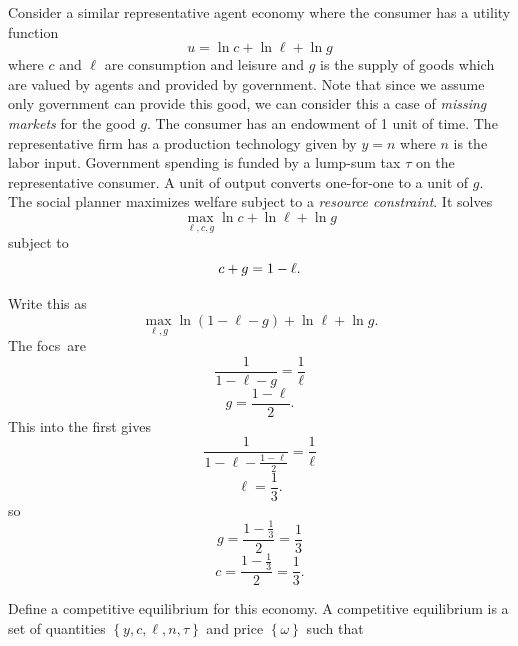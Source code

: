 \documentclass{sebase}
\begin{document}
Consider a similar representative agent economy where the consumer has a
utility function 
\begin{equation*}
u=\ln c+\ln \ell +\ln g
\end{equation*}%
where $c$ and $\ell $ are consumption and leisure and $g$ is the supply of
goods which are valued by agents and provided by government. Note that since
we assume only government can provide this good, we can consider this a case
of \textit{missing markets} for the good $g$. The consumer has an endowment
of 1 unit of time. The representative firm has a production technology given
by $y=n$ where $n$ is the labor input. Government spending is funded by a
lump-sum tax $\tau $ on the representative consumer. A unit of output
converts one-for-one to a unit of $g$. The social planner maximizes welfare
subject to a \textit{resource constraint}. It solves 
\begin{equation*}
\underset{\ell ,c,g}{\max }\ln c+\ln \ell +\ln g
\end{equation*}%
subject to%
\begin{equation}
c+g=1-\ell .  \notag
\end{equation}%
\pagebreak

Write this as%
\begin{equation*}
\underset{\ell ,g}{\max }\ln \left( 1-\ell -g\right) +\ln \ell +\ln g.
\end{equation*}%
The focs\ are 
\begin{equation*}
\frac{1}{1-\ell -g}=\frac{1}{\ell }
\end{equation*}%
\begin{equation*}
g=\frac{1-\ell }{2}.
\end{equation*}%
\pagebreak This into the first gives%
\begin{equation*}
\frac{1}{1-\ell -\frac{1-\ell }{2}}=\frac{1}{\ell }
\end{equation*}%
\begin{equation*}
\ell =\frac{1}{3}.
\end{equation*}%
so 
\begin{equation*}
g=\frac{1-\frac{1}{3}}{2}=\frac{1}{3}
\end{equation*}%
\begin{equation*}
c=\frac{1-\frac{1}{3}}{2}=\frac{1}{3}.
\end{equation*}

\pagebreak

Define a competitive equilibrium for this economy.\newline
A competitive equilibrium is a set of quantities $\left\{ y,c,\ell ,n,\tau
\right\} $ and price $\left\{ \omega \right\} $ such that
\end{document}
